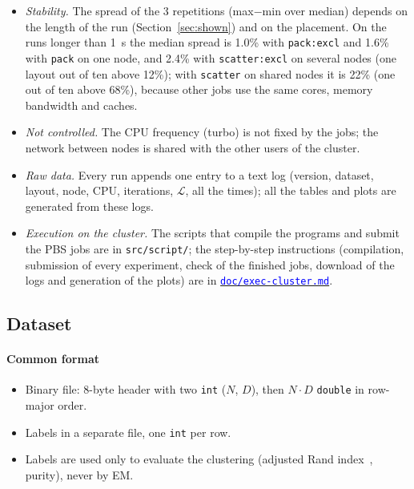 \documentclass[conference,onecolumn]{IEEEtran}
\newcommand{\srclink}[2]{\href{#1}{\textcolor{blue}{#2}}}
\begin{document}
\begin{itemize}
\item \emph{Stability.} The spread of the 3 repetitions (max$-$min over median) depends on the length of the run (Section~\ref{sec:shown}) and on the placement. On the runs longer than 1~s the median spread is 1.0\% with \texttt{pack:excl} and 1.6\% with \texttt{pack} on one node, and 2.4\% with \texttt{scatter:excl} on several nodes (one layout out of ten above 12\%); with \texttt{scatter} on shared nodes it is 22\% (one out of ten above 68\%), because other jobs use the same cores, memory bandwidth and caches.
\item \emph{Not controlled.} The CPU frequency (turbo) is not fixed by the jobs; the network between nodes is shared with the other users of the cluster.
\item \emph{Raw data.} Every run appends one entry to a text log (version, dataset, layout, node, CPU, iterations, $\mathcal{L}$, all the times); all the tables and plots are generated from these logs.
\item \emph{Execution on the cluster.} The scripts that compile the programs and submit the PBS jobs are in \texttt{src/script/}; the step-by-step instructions (compilation, submission of every experiment, check of the finished jobs, download of the logs and generation of the plots) are in \srclink{https://github.com/HPC-2627/ParallelExpectationMaximizationClustering/blob/main/doc/exec-cluster.md}{\texttt{doc/exec-cluster.md}}.
\end{itemize}

\subsection{Dataset}
\paragraph{Common format}
\begin{itemize}
\item Binary file: 8-byte header with two \texttt{int} ($N$, $D$), then $N\cdot D$ \texttt{double} in row-major order.
\item Labels in a separate file, one \texttt{int} per row.
\item Labels are used only to evaluate the clustering (adjusted Rand index~\cite{hubert}, purity), never by EM.
\end{itemize}
\end{document}
